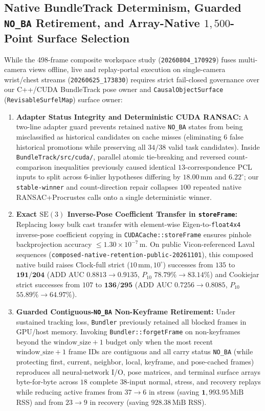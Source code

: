 \documentclass[10pt,journal]{IEEEtran}
\begin{document}
\subsection{Native BundleTrack Determinism, Guarded \texttt{NO\_BA} Retirement, and Array-Native $1{,}500$-Point Surface Selection}
\label{sec:native_bt_governance}
While the 498-frame composite workspace study (\texttt{20260804\_170929}) fuses multi-camera views offline, live and replay-portal execution on single-camera wrist/chest streams (\texttt{20260625\_173830}) requires strict fail-closed governance over our C++/CUDA BundleTrack pose owner and \texttt{CausalObjectSurface} (\texttt{RevisableSurfelMap}) surface owner:
\begin{enumerate}
    \item \textbf{Adapter Status Integrity and Deterministic CUDA RANSAC:} A two-line adapter guard prevents retained native \texttt{NO\_BA} states from being misclassified as historical candidates on cache misses (eliminating $6$ false historical promotions while preserving all $34/38$ valid task candidates). Inside \texttt{BundleTrack/src/cuda/}, parallel atomic tie-breaking and reversed count-comparison inequalities previously caused identical $13$-correspondence PCL inputs to split across $6$-inlier hypotheses differing by $18.00\,\mathrm{mm}$ and $6.22^\circ$; our \texttt{stable-winner} and count-direction repair collapses $100$ repeated native RANSAC+Procrustes calls onto a single deterministic winner.
    \item \textbf{Exact $\mathrm{SE}(3)$ Inverse-Pose Coefficient Transfer in \texttt{storeFrame}:} Replacing lossy bulk cast transfer with element-wise Eigen-to-\texttt{float4x4} inverse-pose coefficient copying in \texttt{CUDACache::storeFrame} ensures pinhole backprojection accuracy $\le 1.30\times 10^{-7}\,\mathrm{m}$. On public Vicon-referenced Laval sequences (\texttt{composed-native-retention-public-20261101}), this composed native build raises Clock-full strict ($10\,\mathrm{mm}, 10^\circ$) successes from $135$ to $\mathbf{191/204}$ (ADD AUC $0.8813 \to \mathbf{0.9135}$, $P_{10}$ $78.79\% \to 83.14\%$) and Cookiejar strict successes from $107$ to $\mathbf{136/295}$ (ADD AUC $0.7256 \to \mathbf{0.8085}$, $P_{10}$ $55.89\% \to 64.97\%$).
    \item \textbf{Guarded Contiguous-\texttt{NO\_BA} Non-Keyframe Retirement:} Under sustained tracking loss, \texttt{Bundler} previously retained all blocked frames in GPU/host memory. Invoking \texttt{Bundler::forgetFrame} on non-keyframes beyond the $\text{window\_size}+1$ budget only when the most recent $\text{window\_size}+1$ frame IDs are contiguous and all carry status \texttt{NO\_BA} (while protecting first, current, neighbor, local, keyframe, and pose-cached frames) reproduces all neural-network I/O, pose matrices, and terminal surface arrays byte-for-byte across $18$ complete $38$-input normal, stress, and recovery replays while reducing active frames from $37 \to 6$ in stress (saving $\mathbf{1{,}993.95\,\mathrm{MiB}}$ RSS) and from $23 \to 9$ in recovery (saving $\mathbf{928.38\,\mathrm{MiB}}$ RSS).

\end{enumerate}
\end{document}
